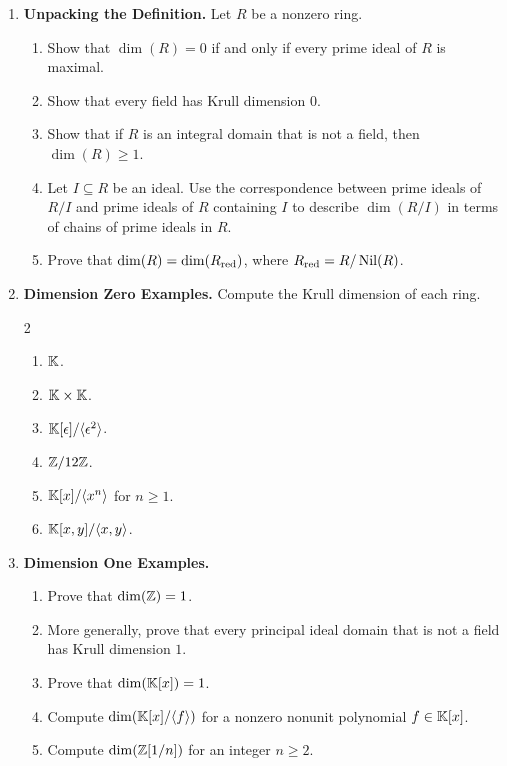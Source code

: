 \documentclass[12pt,reqno]{amsart}
\begin{document}
\hrulefill

\begin{enumerate}[leftmargin=*, resume=problems]

\item \textbf{Unpacking the Definition.} Let $R$ be a nonzero ring.
\begin{enumerate}
    \item Show that $\dim(R)=0$ if and only if every prime ideal of $R$ is maximal.
    \item Show that every field has Krull dimension $0$.
    \item Show that if $R$ is an integral domain that is not a field, then $\dim(R)\geq 1$.
    \item Let $I\subseteq R$ be an ideal. Use the correspondence between prime ideals of $R/I$ and prime ideals of $R$ containing $I$ to describe $\dim(R/I)$ in terms of chains of prime ideals in $R$.
    \item Prove that $\dim(R)=\dim(R_{\operatorname{red}})$, where $R_{\operatorname{red}}=R/\operatorname{Nil}(R)$.
\end{enumerate}

\item \textbf{Dimension Zero Examples.} Compute the Krull dimension of each ring.
\begin{multicols}{2}
\begin{enumerate}
    \item $\mathbb{K}$.
    \item $\mathbb{K}\times \mathbb{K}$.
    \item $\mathbb{K}[\epsilon]/\langle \epsilon^2\rangle$.
    \item $\mathbb{Z}/12\mathbb{Z}$.
    \item $\mathbb{K}[x]/\langle x^n\rangle$ for $n\geq 1$.
    \item $\mathbb{K}[x,y]/\langle x,y\rangle$.
\end{enumerate}
\end{multicols}

\item \textbf{Dimension One Examples.} 
\begin{enumerate}
    \item Prove that $\dim(\mathbb{Z})=1$.
    \item More generally, prove that every principal ideal domain that is not a field has Krull dimension $1$.
    \item Prove that $\dim(\mathbb{K}[x])=1$.
    \item Compute $\dim(\mathbb{K}[x]/\langle f\rangle)$ for a nonzero nonunit polynomial $f\in \mathbb{K}[x]$.
    \item Compute $\dim(\mathbb{Z}[1/n])$ for an integer $n\geq 2$.
\end{enumerate}


\end{enumerate}
\end{document}
